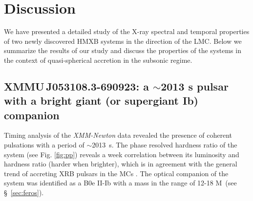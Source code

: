 \documentclass[a4paper,fleqn,usenatbib]{mnras}
\newcommand{\xmm}{{\it XMM-Newton}\xspace}
\newcommand{\canda}{XMMU\,J053108.3-690923\xspace} %
\begin{document}
\section{Discussion}
 \label{discussion}

We have presented a detailed study of the X-ray spectral and temporal properties of two newly discovered HMXB systems in the direction of the LMC.
Below we summarize the results of our study and discuss the properties of the systems in the context of quasi-spherical accretion in the subsonic regime. 

\subsection{\canda: a $\sim$2013 s pulsar with a bright giant (or supergiant Ib) companion}


Timing analysis of the \xmm data revealed the presence of coherent pulsations with a period of $\sim$2013~s. The phase resolved hardness ratio of the system (see Fig. \ref{fig:pp}) 
reveals a week correlation between its luminosity and hardness ratio (harder when brighter), which is in agreement with the general trend of accreting XRB pulsars in the MCs \citep[e.g.][]{2014A&A...567A.129V,2014MNRAS.444.3571S,koliopanos17}.
The optical companion of the system was identified as a B0e II-Ib with a mass in the range of 12-18 M\sun~(see \S~\ref{sec:feros}).
\end{document}
